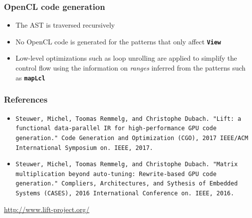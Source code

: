 \documentclass[10pt]{beamer}
\newcommand{\code}[1]{\textbf{\texttt{#1}}}
\begin{document}
\begin{frame}
\frametitle{OpenCL code generation}
\begin{itemize}
	\item The AST is traversed recursively
	\item No OpenCL code is generated for the patterns that only affect \code{View}
	\item Low-level optimizations such as loop unrolling are applied to simplify the control flow using the information on \textit{ranges} inferred from the patterns such as \code{mapLcl}
\end{itemize}
\end{frame}

\begin{frame}
\frametitle{References}
\begin{itemize}
	\item \texttt{Steuwer, Michel, Toomas Remmelg, and Christophe Dubach. "Lift: a functional data-parallel IR for high-performance GPU code generation." Code Generation and Optimization (CGO), 2017 IEEE/ACM International Symposium on. IEEE, 2017.}
	\item \texttt{Steuwer, Michel, Toomas Remmelg, and Christophe Dubach. "Matrix multiplication beyond auto-tuning: Rewrite-based GPU code generation." Compliers, Architectures, and Sythesis of Embedded Systems (CASES), 2016 International Conference on. IEEE, 2016.}
\end{itemize}
\begin{center}
\textcolor{blue}{\url{http://www.lift-project.org/}}
\end{center}
\end{frame}
\end{document}
